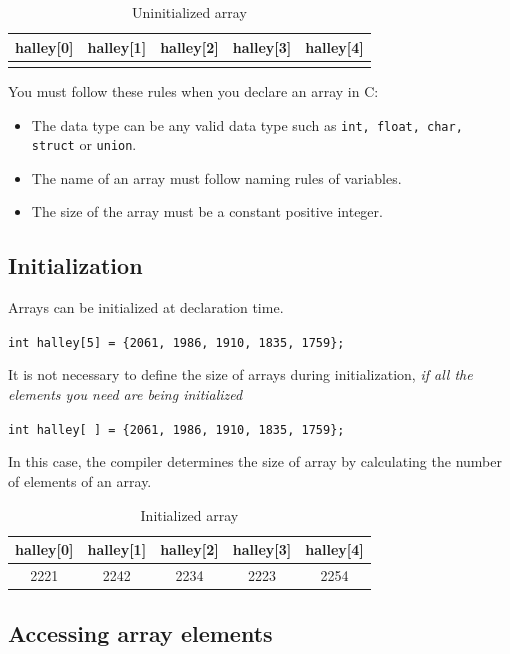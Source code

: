 \documentclass[11pt,a4paper]{article}
\begin{document}
\begin{table}[ht]
\centering
\begin{tabular}{|c|c|c|c|c|}
halley[0]& halley[1]& halley[2]& halley[3]& halley[4]\\\hline
& & & & \\\hline
\end{tabular}
\caption{Uninitialized array}
\label{UninitializedArray}
\end{table}


You must follow these rules when you declare an array in C:
\begin{itemize}
\item The data type can be any valid data type  such as \lstinline!int, float, char,  struct!  or  \lstinline!union!.
\item The name of an array must follow  naming  rules of variables.
\item The size of the array must be a constant positive integer. 
\end{itemize}

\subsection*{Initialization}
 Arrays can be initialized at declaration time. 

\lstinline!int halley[5] = {2061, 1986, 1910, 1835, 1759};!

It is not necessary to define the size of arrays during initialization, \emph{if all the elements you need are being initialized}

\lstinline!int halley[ ] = {2061, 1986, 1910, 1835, 1759};!

In this case, the compiler determines the size of array by calculating the number of elements of an array.

\begin{table}[ht]
\centering
\begin{tabular}{|c|c|c|c|c|}
halley[0]& halley[1]& halley[2]& halley[3]& halley[4]\\\hline
2221 & 2242 & 2234 & 2223 & 2254\\\hline
\end{tabular}
\caption{Initialized array}
\label{InitializedArray}
\end{table}

\subsection*{Accessing array elements}
\end{document}
